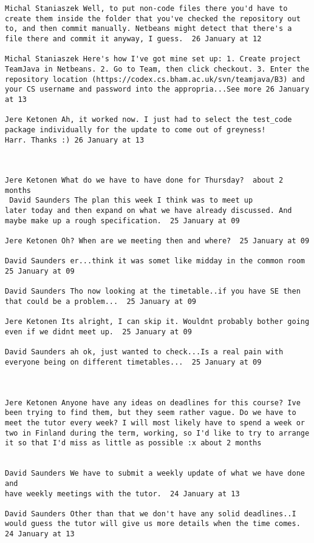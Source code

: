 \begin{verbatim}
Michal Staniaszek Well, to put non-code files there you'd have to
create them inside the folder that you've checked the repository out
to, and then commit manually. Netbeans might detect that there's a
file there and commit it anyway, I guess.  26 January at 12

Michal Staniaszek Here's how I've got mine set up: 1. Create project
TeamJava in Netbeans. 2. Go to Team, then click checkout. 3. Enter the
repository location (https://codex.cs.bham.ac.uk/svn/teamjava/B3) and
your CS username and password into the appropria...See more 26 January
at 13

Jere Ketonen Ah, it worked now. I just had to select the test_code
package individually for the update to come out of greyness!
Harr. Thanks :) 26 January at 13



Jere Ketonen What do we have to have done for Thursday?  about 2
months 
 David Saunders The plan this week I think was to meet up
later today and then expand on what we have already discussed. And
maybe make up a rough specification.  25 January at 09

Jere Ketonen Oh? When are we meeting then and where?  25 January at 09

David Saunders er...think it was somet like midday in the common room
25 January at 09

David Saunders Tho now looking at the timetable..if you have SE then
that could be a problem...  25 January at 09

Jere Ketonen Its alright, I can skip it. Wouldnt probably bother going
even if we didnt meet up.  25 January at 09

David Saunders ah ok, just wanted to check...Is a real pain with
everyone being on different timetables...  25 January at 09



Jere Ketonen Anyone have any ideas on deadlines for this course? Ive
been trying to find them, but they seem rather vague. Do we have to
meet the tutor every week? I will most likely have to spend a week or
two in Finland during the term, working, so I'd like to try to arrange
it so that I'd miss as little as possible :x about 2 months 
 

David Saunders We have to submit a weekly update of what we have done and
have weekly meetings with the tutor.  24 January at 13

David Saunders Other than that we don't have any solid deadlines..I
would guess the tutor will give us more details when the time comes.
24 January at 13


\end{verbatim}
